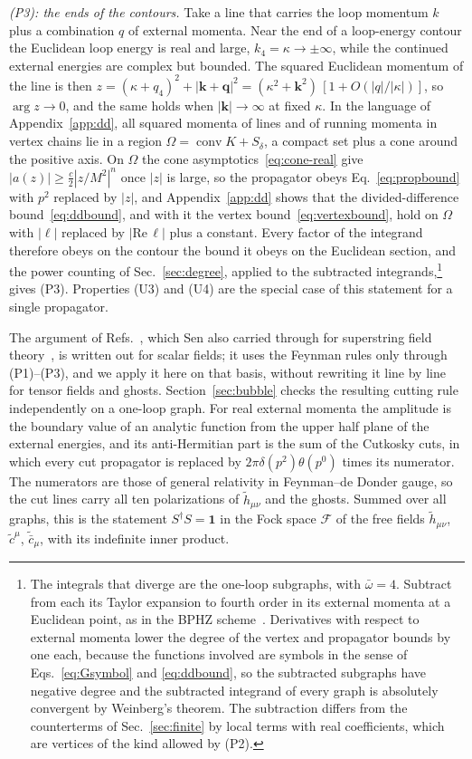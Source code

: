 \documentclass[a4paper,11pt]{article}
\begin{document}
\textit{(P3): the ends of the contours.} Take a line that carries the loop momentum $k$ plus a combination $q$ of external momenta. Near the end of a loop-energy contour the Euclidean loop energy is real and large, $k_4=\kappa\to\pm\infty$, while the continued external energies are complex but bounded. The squared Euclidean momentum of the line is then $z=(\kappa+q_4)^2+|\mathbf k+\mathbf q|^2=(\kappa^2+\mathbf k^2)\,[1+O(|q|/|\kappa|)]$, so $\arg z\to0$, and the same holds when $|\mathbf k|\to\infty$ at fixed $\kappa$. In the language of Appendix~\ref{app:dd}, all squared momenta of lines and of running momenta in vertex chains lie in a region $\Omega=\operatorname{conv}K+S_\delta$, a compact set plus a cone around the positive axis. On $\Omega$ the cone asymptotics~\eqref{eq:cone-real} give $|a(z)|\ge\frac c2|z/M^2|^n$ once $|z|$ is large, so the propagator obeys Eq.~\eqref{eq:propbound} with $p^2$ replaced by $|z|$, and Appendix~\ref{app:dd} shows that the divided-difference bound~\eqref{eq:ddbound}, and with it the vertex bound~\eqref{eq:vertexbound}, hold on $\Omega$ with $|\ell|$ replaced by $|\mathrm{Re}\,\ell|$ plus a constant. Every factor of the integrand therefore obeys on the contour the bound it obeys on the Euclidean section, and the power counting of Sec.~\ref{sec:degree}, applied to the subtracted integrands,\footnote{The integrals that diverge are the one-loop subgraphs, with $\bar\omega=4$. Subtract from each its Taylor expansion to fourth order in its external momenta at a Euclidean point, as in the BPHZ scheme~\cite{Collins1984}. Derivatives with respect to external momenta lower the degree of the vertex and propagator bounds by one each, because the functions involved are symbols in the sense of Eqs.~\eqref{eq:Gsymbol} and \eqref{eq:ddbound}, so the subtracted subgraphs have negative degree and the subtracted integrand of every graph is absolutely convergent by Weinberg's theorem. The subtraction differs from the counterterms of Sec.~\ref{sec:finite} by local terms with real coefficients, which are vertices of the kind allowed by (P2).} gives (P3). Properties (U3) and (U4) are the special case of this statement for a single propagator.

The argument of Refs.~\cite{PiusSen2016,BrisceseModesto2019}, which Sen also carried through for superstring field theory~\cite{Sen2016}, is written out for scalar fields; it uses the Feynman rules only through (P1)--(P3), and we apply it here on that basis, without rewriting it line by line for tensor fields and ghosts. Section~\ref{sec:bubble} checks the resulting cutting rule independently on a one-loop graph. For real external momenta the amplitude is the boundary value of an analytic function from the upper half plane of the external energies, and its anti-Hermitian part is the sum of the Cutkosky cuts, in which every cut propagator is replaced by $2\pi\delta(p^2)\theta(p^0)$ times its numerator. The numerators are those of general relativity in Feynman--de Donder gauge, so the cut lines carry all ten polarizations of $\tilde h_{\mu\nu}$ and the ghosts. Summed over all graphs, this is the statement $S^\dagger S=\mathbf 1$ in the Fock space $\mathcal F$ of the free fields $\tilde h_{\mu\nu}$, $\tilde c^\mu$, $\tilde{\bar c}_\mu$, with its indefinite inner product.
\end{document}
